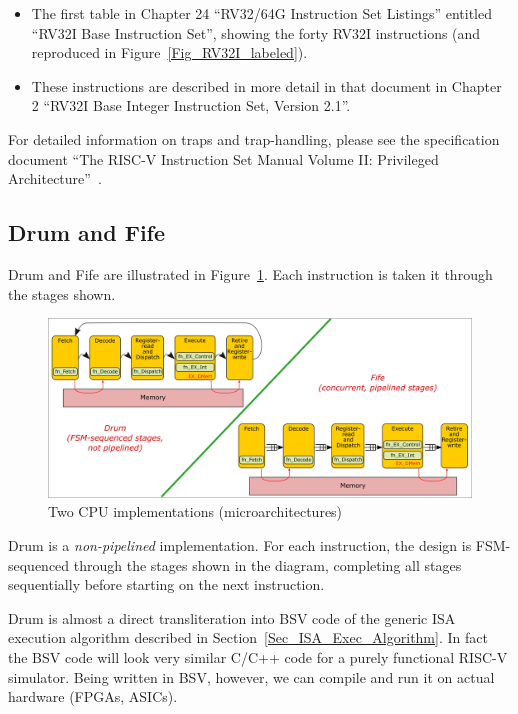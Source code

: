 \begin{itemize}

 \item The first table in Chapter 24 ``RV32/64G Instruction Set
       Listings'' entitled ``RV32I Base Instruction Set'', showing the
       forty RV32I instructions (and reproduced in
       Figure~\ref{Fig_RV32I_labeled}).

 \item These instructions are described in more detail in that
       document in Chapter 2 ``RV32I Base Integer Instruction Set,
       Version 2.1''.

\end{itemize}

For detailed information on traps and trap-handling, please see the
specification document ``The RISC-V Instruction Set Manual Volume II:
Privileged Architecture''~\cite{RISCV_Priv_2021_12_03}.


\subsection{Drum and Fife}

Drum and Fife are illustrated in
Figure~\ref{Fig_Two_Microarchitectures}.  Each instruction is taken it
through the stages shown.
\begin{figure}[htbp]
  \centerline{\includegraphics[width=6in,angle=0]{Figures/Fig_Two_Microarchitectures}}
  \caption{\label{Fig_Two_Microarchitectures}Two CPU implementations (microarchitectures)}
\end{figure}

Drum is a \emph{non-pipelined} implementation.  For each instruction,
the design is FSM-sequenced through the stages shown in the diagram,
completing all stages sequentially before starting on the next
instruction.

Drum is almost a direct transliteration into BSV code of the generic
ISA execution algorithm described in
Section~\ref{Sec_ISA_Exec_Algorithm}.  In fact the BSV code will look
very similar C/C++ code for a purely functional RISC-V simulator.
Being written in BSV, however, we can compile and run it on actual
hardware (FPGAs, ASICs).
       
